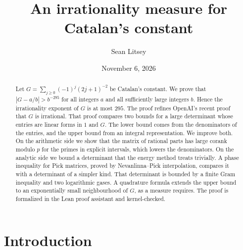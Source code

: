\documentclass[11pt]{amsart}
\theoremstyle{definition}
\theoremstyle{remark}
\numberwithin{equation}{section}
\begin{document}
\title{An irrationality measure for Catalan's constant}

\author{Sean Litsey}

\date{November 6, 2026}



\begin{abstract}
Let $G=\sum_{j\ge0}(-1)^j(2j+1)^{-2}$ be Catalan's constant. We prove that $|G-a/b|>b^{-295}$ for all
integers $a$ and all sufficiently large integers $b$. Hence the irrationality exponent of $G$ is at most
$295$. The proof refines OpenAI's recent proof that $G$ is irrational. That proof compares two bounds for
a large determinant whose entries are linear forms in $1$ and $G$. The lower bound comes from the
denominators of the entries, and the upper bound from an integral representation. We improve both. On the
arithmetic side we show that the matrix of rational parts has large corank modulo $p$ for the primes in
explicit intervals, which lowers the denominators. On the analytic side we bound a determinant that the
energy method treats trivially. A phase inequality for Pick matrices, proved by Nevanlinna--Pick
interpolation, compares it with a determinant of a simpler kind. That determinant is bounded by a finite
Gram inequality and two logarithmic gases. A quadrature formula extends the upper bound to an
exponentially small neighbourhood of $G$, as a measure requires. The proof is formalized in the Lean proof
assistant and kernel-checked.
\end{abstract}

\maketitle

\tableofcontents

\section{Introduction}\label{sec:intro}
\end{document}
